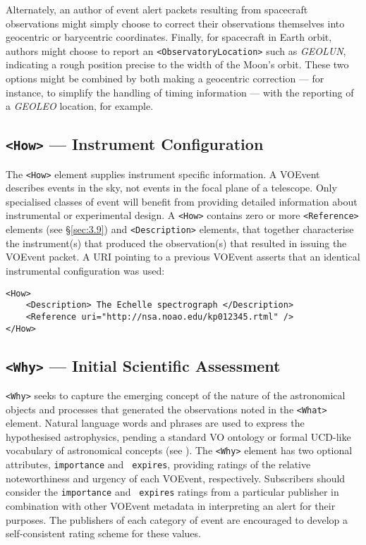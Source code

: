 \documentclass[11pt,a4paper]{ivoa}
\begin{document}
Alternately, an author of event alert packets resulting from spacecraft
observations might simply choose to correct their observations themselves into
geocentric or barycentric coordinates. Finally, for spacecraft in Earth orbit,
authors might choose to report an {\tt <ObservatoryLocation>} such as
\emph{GEOLUN}, indicating a rough position precise to the width of the Moon's
orbit. These two options might be combined by both making a geocentric
correction --- for instance, to simplify the handling of timing information ---
with the reporting of a \emph{GEOLEO} location, for example.

\subsection{{\tt <How>} --- Instrument Configuration}
\label{sec:3.5}
The {\tt <How>} element supplies instrument specific information. A VOEvent
describes events in the sky, not events in the focal plane of a telescope. Only
specialised classes of event will benefit from providing detailed information
about instrumental or experimental design. A {\tt <How>} contains zero or more
{\tt <Reference>} elements (see \S\ref{sec:3.9}) and {\tt <Description>}
elements, that together characterise the instrument(s) that produced the
observation(s) that resulted in issuing the VOEvent packet. A URI pointing to a
previous VOEvent asserts that an identical instrumental configuration was used:
\begin{lstlisting}
<How>
    <Description> The Echelle spectrograph </Description>
    <Reference uri="http://nsa.noao.edu/kp012345.rtml" />
</How>
\end{lstlisting}

\subsection{{\tt <Why>} --- Initial Scientific Assessment}
\label{sec:3.6}
{\tt <Why>} seeks to capture the emerging concept of the nature of the
astronomical objects and processes that generated the observations noted in the
{\tt <What>} element. Natural language words and phrases are used to express the
hypothesised astrophysics, pending a standard VO ontology or formal UCD-like
vocabulary of astronomical concepts (see \citet{2018ivoa.spec.0527P}).
The {\tt <Why>} element has two optional attributes, {\tt importance} and {\tt
expires}, providing ratings of the relative noteworthiness and urgency of each
VOEvent, respectively. Subscribers should consider the {\tt importance} and {\tt
expires} ratings from a particular publisher in combination with other VOEvent
metadata in interpreting an alert for their purposes. The publishers of each
category of event are encouraged to develop a self-consistent rating scheme for
these values.
\end{document}
